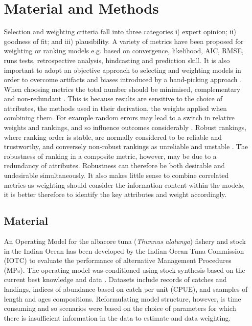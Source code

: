 \documentclass[a4paper]{article}
\begin{document}
\section*{Material and Methods}

Selection and weighting criteria fall into three categories i) expert opinion; ii) goodness of fit; and iii) plausibility. A variety of metrics have been proposed for weighting or ranking models e.g. based on convergence, likelihood, AIC, RMSE, runs tests, retrospective analysis, hindcasting and prediction skill. It is also important to adopt an objective approach to selecting and weighting models in order to overcome artifacts and biases introduced by a hand-picking approach \citep{pechlivanidis2018information}. When choosing metrics the total number should be minimised, complementary and non-redundant \citep{shin2010can, kershner2011selecting}. This is because results are sensitive to the choice of attributes, the methods used in their derivation, the weights applied when combining them. For example random errors may lead to a switch in relative weights and rankings, and so influence outcomes considerably \citep{freyer2014robust}. Robust rankings, where ranking order is stable, are normally considered to be reliable and trustworthy, and conversely non-robust rankings as unreliable and unstable \citep{permanyer2011assessing}. The robustness of ranking in a composite metric, however, may be due to a redundancy of attributes. Robustness can therefore be both desirable and undesirable simultaneously. It also makes little sense to combine correlated metrics
\citep{mcgillivray1991human} as weighting should consider the information content within the models, it is better therefore to identify the key attributes and weight accordingly.

\subsection*{Material}

An Operating Model for the albacore tuna (\textit{Thunnus alalunga}) fishery and stock in the Indian Ocean has been developed by the Indian Ocean Tuna Commission (IOTC) to evaluate the performance of alternative Management Procedures (MPs). The operating model was conditioned using stock synthesis \citep[SS3][]{MethotW2013} based on the current best knowledge and data \citep{ptmt2014}. Datasets include records of catches and landings, indices of abundance based on catch per unit (CPUE), and  saamples of length and ages compositions. Reformulating model structure, however, is time consuming and so scenarios were based on the choice of parameters for which there is insufficient information in the data to estimate and data weighting. 
\end{document}
